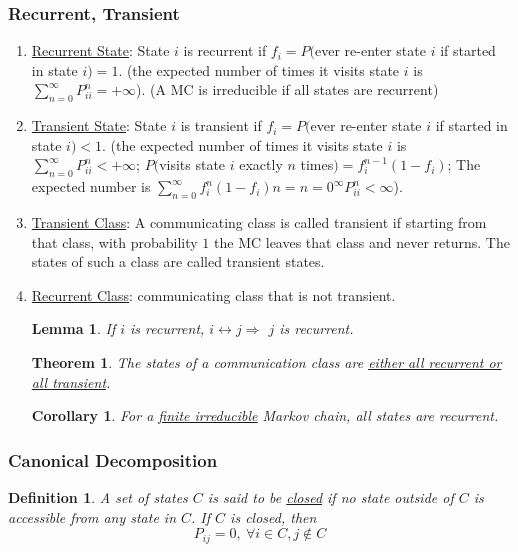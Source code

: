 \documentclass[11pt,a4paper]{article}
\newtheorem{theorem}{Theorem}
\newtheorem{definition}{Definition}
\newtheorem{lemma}{Lemma}
\newtheorem{corollary}{Corollary}
\begin{document}
\subsubsection{Recurrent, Transient}
\begin{enumerate}[$\bullet$]
    \item \underline{Recurrent State}: State $i$ is recurrent if $f_i=P($ever re-enter state $i$ if started in state $i)=1$. (the expected number of times it visits state $i$ is $\sum_{n=0}^\infty P_{ii}^n=+\infty$). (A MC is irreducible if all states are recurrent)
    \item \underline{Transient State}: State $i$ is transient if $f_i=P($ever re-enter state $i$ if started in state $i)<1$. (the expected number of times it visits state $i$ is $\sum_{n=0}^\infty P_{ii}^n<+\infty$; $P($visits state $i$ exactly $n$ times$)=f_i^{n-1}(1-f_i)$; The expected number is $\sum_{n=0}^\infty f_i^n(1-f_i)n={n=0}^\infty P_{ii}^n<\infty$).
    \item \underline{Transient Class}: A communicating class is called transient if starting from that class, with probability $1$ the MC leaves that class and never returns. The states of such a class are called transient states.
    \item \underline{Recurrent Class}: communicating class that is not transient.
    \begin{lemma}
        If $i$ is recurrent, $i\leftrightarrow j \Rightarrow$ $j$ is recurrent.
    \end{lemma}
    \begin{theorem}
        The states of a communication class are \underline{either all recurrent or all transient}.
    \end{theorem}
    \begin{corollary}
        For a \underline{finite irreducible} Markov chain, all states are recurrent.
    \end{corollary}
\end{enumerate}

\subsubsection*{Canonical Decomposition}
\begin{definition}
    A set of states $C$ is said to be \underline{closed} if no state outside of $C$ is accessible from any state in $C$. If $C$ is closed, then $$P_{ij} = 0,\ \forall i\in C,j\notin C$$
\end{definition}
\end{document}
